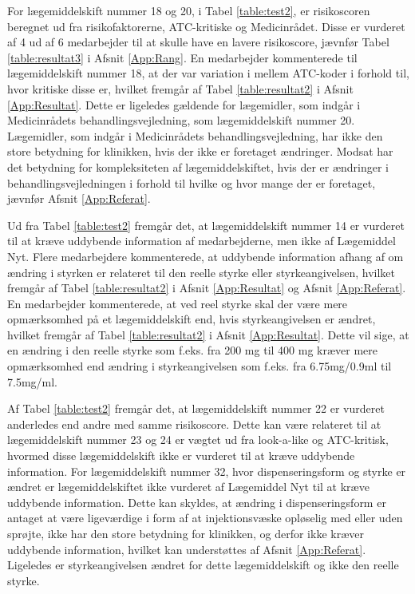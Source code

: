 For lægemiddelskift nummer 18 og 20, i Tabel \ref{table:test2}, er risikoscoren beregnet ud fra risikofaktorerne, ATC-kritiske og Medicinrådet. Disse er vurderet af 4 ud af 6 medarbejder til at skulle have en lavere risikoscore, jævnfør Tabel \ref{table:resultat3} i Afsnit \ref{App:Rang}. En medarbejder kommenterede til lægemiddelskift nummer 18, at der var variation
i mellem ATC-koder i forhold til, hvor kritiske disse er, hvilket fremgår af Tabel \ref{table:resultat2} i Afsnit \ref{App:Resultat}. Dette er ligeledes gældende for lægemidler, som indgår i Medicinrådets behandlingsvejledning, som lægemiddelskift nummer 20. Lægemidler, som indgår i Medicinrådets behandlingsvejledning, har ikke den store betydning for klinikken, hvis der ikke er foretaget ændringer. Modsat har det betydning for kompleksiteten af lægemiddelskiftet, hvis der er ændringer i behandlingsvejledningen i forhold til hvilke og hvor mange der er foretaget, jævnfør Afsnit \ref{App:Referat}.

Ud fra Tabel \ref{table:test2} fremgår det, at lægemiddelskift nummer 14 er vurderet til at kræve uddybende information af medarbejderne, men ikke af Lægemiddel Nyt. %
Flere medarbejdere kommenterede, at uddybende information afhang af om ændring i styrken er relateret til den reelle styrke eller styrkeangivelsen, hvilket fremgår af Tabel \ref{table:resultat2} i Afsnit \ref{App:Resultat} og Afsnit \ref{App:Referat}. En medarbejder kommenterede, at ved reel styrke skal der være mere opmærksomhed på et lægemiddelskift end, hvis styrkeangivelsen er ændret, hvilket fremgår af Tabel \ref{table:resultat2} i Afsnit \ref{App:Resultat}. Dette vil sige, at en ændring i den reelle styrke som f.eks. fra 200 mg til 400 mg kræver mere opmærksomhed end ændring i styrkeangivelsen som f.eks. fra 6.75mg/0.9ml til 7.5mg/ml.

Af Tabel \ref{table:test2} fremgår det, at lægemiddelskift nummer 22 er vurderet anderledes end andre med samme risikoscore. Dette kan være relateret til at lægemiddelskift nummer 23 og 24 er vægtet ud fra look-a-like og ATC-kritisk, hvormed disse lægemiddelskift ikke er vurderet til at kræve uddybende information. For lægemiddelskift nummer 32, hvor dispenseringsform og styrke er ændret er lægemiddelskiftet ikke vurderet af Lægemiddel Nyt til at kræve uddybende information. Dette kan skyldes, at ændring i dispenseringsform er antaget at være ligeværdige i form af at injektionsvæske opløselig med eller uden sprøjte, ikke har den store betydning for klinikken, og derfor ikke kræver uddybende information, hvilket kan understøttes af Afsnit \ref{App:Referat}.
Ligeledes er styrkeangivelsen ændret for dette lægemiddelskift og ikke den reelle styrke. 


